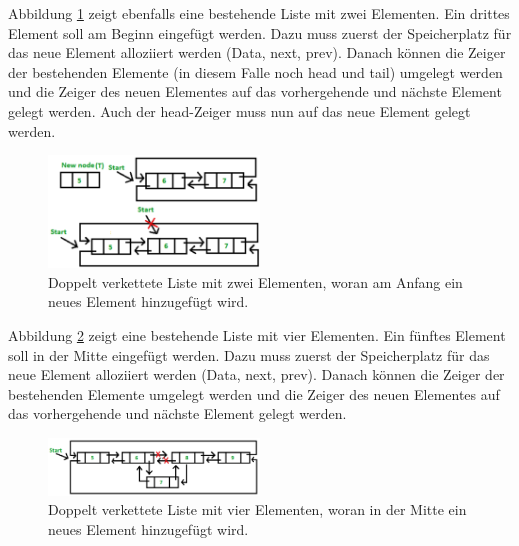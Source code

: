 Abbildung \ref{fig:Doubly_Linked_List_2_2} zeigt ebenfalls eine bestehende Liste mit zwei Elementen. Ein drittes Element soll am Beginn eingefügt werden. Dazu muss zuerst der Speicherplatz für das neue Element alloziiert werden (Data, next, prev). Danach können die Zeiger der bestehenden Elemente (in diesem Falle noch head und tail) umgelegt werden und die Zeiger des neuen Elementes auf das vorhergehende und nächste Element gelegt werden. Auch der head-Zeiger muss nun auf das neue Element gelegt werden.

\begin{figure}[H]
	\centering
	\includegraphics[width=0.5\textwidth]{graphics/Doubly_Linked_List_2_2}
	\caption{Doppelt verkettete Liste mit zwei Elementen, woran am Anfang ein neues Element hinzugefügt wird.\cite{kumar_doubly_2017}}
	\label{fig:Doubly_Linked_List_2_2}
\end{figure}


Abbildung \ref{fig:Doubly_Linked_List_2_3} zeigt eine bestehende Liste mit vier Elementen. Ein fünftes Element soll in der Mitte eingefügt werden. Dazu muss zuerst der Speicherplatz für das neue Element alloziiert werden (Data, next, prev). Danach können die Zeiger der bestehenden Elemente umgelegt werden und die Zeiger des neuen Elementes auf das vorhergehende und nächste Element gelegt werden.

\begin{figure}[H]
	\centering
	\includegraphics[width=0.5\textwidth]{graphics/Doubly_Linked_List_2_3}
	\caption{Doppelt verkettete Liste mit vier Elementen, woran in der Mitte ein neues Element hinzugefügt wird.\cite{kumar_doubly_2017}}
	\label{fig:Doubly_Linked_List_2_3}
\end{figure}

